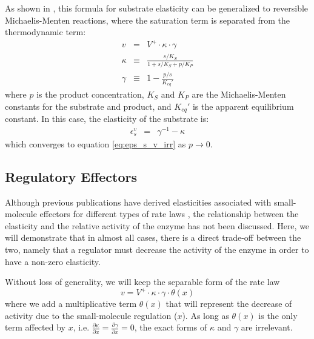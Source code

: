 \documentclass[12pt,a4paper]{article}
\begin{document}
\begin{center}
\end{center}

As shown in \cite{Noor2013-vv}, this formula for substrate elasticity can be generalized to reversible Michaelis-Menten reactions, where the saturation term is separated from the thermodynamic term:
\begin{eqnarray}
    v &=& V^+ \cdot \kappa \cdot \gamma \\
    \kappa &\equiv& \frac{s/K_S}{1 + s/K_S + p/K_P} \\
    \gamma &\equiv& 1 - \frac{p/s}{K_{eq}'}
\end{eqnarray}
where $p$ is the product concentration, $K_S$ and $K_P$ are the Michaelis-Menten constants for the substrate and product, and $K_{eq}'$ is the apparent equilibrium constant. In this case, the elasticity of the substrate is:
\begin{eqnarray}
    \epsilon_s^v &=& \gamma^{-1} - \kappa
\end{eqnarray}
which converges to equation \ref{eq:eps_s_v_irr} as $p \rightarrow 0$.

\subsection{Regulatory Effectors}
Although previous publications have derived elasticities associated with small-molecule effectors for different types of rate laws \cite{Heinrich1974-yj, Liebermeister2010-vd}, the relationship between the elasticity and the relative activity of the enzyme has not been discussed. Here, we will demonstrate that in almost all cases, there is a direct trade-off between the two, namely that a regulator must decrease the activity of the enzyme in order to have a non-zero elasticity.

Without loss of generality, we will keep the separable form of the rate law
\[v = V^+ \cdot \kappa \cdot \gamma \cdot \theta(x)\]
where we add a multiplicative term $\theta(x)$ that will represent the decrease of activity due to the small-molecule regulation ($x$). As long as $\theta(x)$ is the only term affected by $x$, i.e. $\frac{\partial \kappa}{\partial x} = \frac{\partial \gamma}{\partial x} = 0$, the exact forms of $\kappa$ and $\gamma$ are irrelevant.
\end{document}
